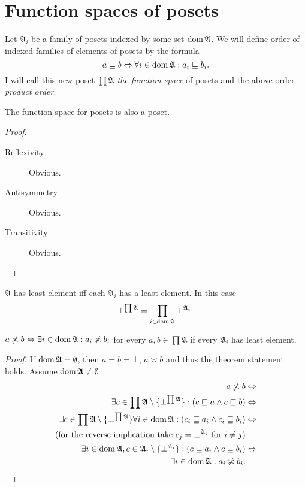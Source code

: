 \section{Function spaces of posets}
\begin{defn}
Let $\mathfrak{A}_{i}$ be a family of posets indexed by some set
$\operatorname{dom}\mathfrak{A}$. We will define order of indexed families of elements of posets by
the formula 
\[
a\sqsubseteq b\Leftrightarrow\forall i\in\operatorname{dom}\mathfrak{A}:a_{i}\sqsubseteq b_{i}.
\]
I will call
this new poset $\prod\mathfrak{A}$ \emph{the function
space} of posets and the above order \emph{product order}.\end{defn}
\begin{prop}
The function space for posets is also a poset.\end{prop}
\begin{proof}
~
\begin{description}
\item [{Reflexivity}] Obvious.
\item [{Antisymmetry}] Obvious.
\item [{Transitivity}] Obvious.
\end{description}
\end{proof}
\begin{obvious}
$\mathfrak{A}$ has least element iff each $\mathfrak{A}_{i}$ has
a least element. In this case
\[
\bot^{\prod\mathfrak{A}}=\prod_{i\in\operatorname{dom}\mathfrak{A}}\bot^{\mathfrak{A}_{i}}.
\]
\end{obvious}
\begin{prop}
$a\not\asymp b\Leftrightarrow\exists i\in\operatorname{dom}\mathfrak{A}:a_{i}\not\asymp b_{i}$
for every $a,b\in\prod\mathfrak{A}$ if every $\mathfrak{A}_{i}$
has least element.\end{prop}
\begin{proof}
If $\operatorname{dom}\mathfrak{A}=\emptyset$, then $a=b=\bot$, $a\asymp b$ and
thus the theorem statement holds. Assume $\operatorname{dom}\mathfrak{A}\neq\emptyset$.
\begin{align*}
a\not\asymp b & \Leftrightarrow\\
\exists c\in\prod\mathfrak{A}\setminus\{\bot^{\prod\mathfrak{A}}\}:(c\sqsubseteq a\land c\sqsubseteq b) & \Leftrightarrow\\
\exists c\in\prod\mathfrak{A}\setminus\{\bot^{\prod\mathfrak{A}}\}\forall i\in\operatorname{dom}\mathfrak{A}:(c_{i}\sqsubseteq a_{i}\land c_{i}\sqsubseteq b_{i}) & \Leftrightarrow\\
\text{(for the reverse implication take \ensuremath{c_{j}=\bot^{\mathfrak{A}_{j}}} for \ensuremath{i\ne j})}\\
\exists i\in\operatorname{dom}\mathfrak{A},c\in\mathfrak{A}_{i}\setminus\{\bot^{\mathfrak{A}_{i}}\}:(c\sqsubseteq a_{i}\land c\sqsubseteq b_{i}) & \Leftrightarrow\\
\exists i\in\operatorname{dom}\mathfrak{A}:a_{i}\not\asymp b_{i}.
\end{align*}
\end{proof}
